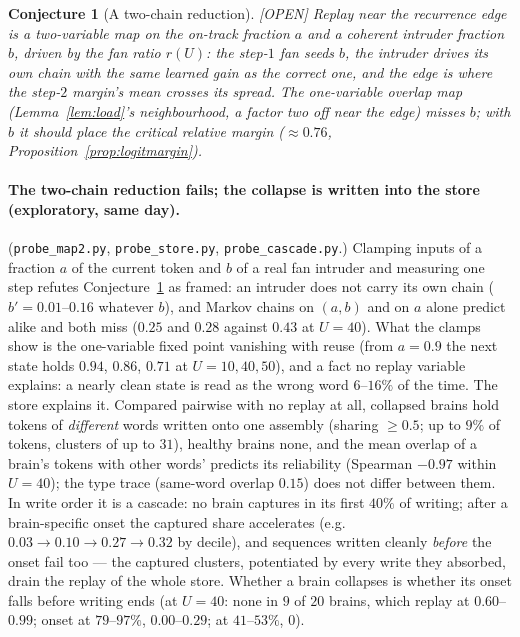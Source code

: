 \documentclass[11pt]{article}
\theoremstyle{definition}
\theoremstyle{plain}
\newtheorem{conjecture}[lemma]{Conjecture}
\newcommand{\OPEN}{\textnormal{\footnotesize\textsf{[OPEN]}}}
\begin{document}
\begin{conjecture}[A two-chain reduction]\label{conj:twochain} \OPEN
Replay near the recurrence edge is a two-variable map on the on-track fraction
$a$ and a coherent intruder fraction $b$, driven by the fan ratio $r(U)$: the
step-$1$ fan seeds $b$, the intruder drives its own chain with the same learned
gain as the correct one, and the edge is where the step-$2$ margin's mean
crosses its spread. The one-variable overlap map (Lemma~\ref{lem:load}'s
neighbourhood, a factor two off near the edge) misses $b$; with $b$ it should
place the critical relative margin ($\approx 0.76$, Proposition~\ref{prop:logitmargin}).
\end{conjecture}

\paragraph{The two-chain reduction fails; the collapse is written into the store
(exploratory, same day).} (\texttt{probe\_map2.py}, \texttt{probe\_store.py},
\texttt{probe\_cascade.py}.) Clamping inputs of a fraction $a$ of the current
token and $b$ of a real fan intruder and measuring one step refutes
Conjecture~\ref{conj:twochain} as framed: an intruder does not carry its own
chain ($b' = 0.01$--$0.16$ whatever $b$), and Markov chains on $(a,b)$ and on $a$
alone predict alike and both miss ($0.25$ and $0.28$ against $0.43$ at $U = 40$).
What the clamps show is the one-variable fixed point vanishing with reuse (from
$a = 0.9$ the next state holds $0.94$, $0.86$, $0.71$ at $U = 10, 40, 50$), and a
fact no replay variable explains: a nearly clean state is read as the wrong
word $6$--$16\%$ of the time. The store explains it. Compared pairwise with no
replay at all, collapsed brains hold tokens of \emph{different} words written
onto one assembly (sharing $\ge 0.5$; up to $9\%$ of tokens, clusters of up to
$31$), healthy brains none, and the mean overlap of a brain's tokens with other
words' predicts its reliability (Spearman $-0.97$ within $U = 40$); the type
trace (same-word overlap $0.15$) does not differ between them. In write order
it is a cascade: no brain captures in its first $40\%$ of writing; after a
brain-specific onset the captured share accelerates (e.g.\ $0.03 \to 0.10 \to
0.27 \to 0.32$ by decile), and sequences written cleanly \emph{before} the onset
fail too --- the captured clusters, potentiated by every write they absorbed,
drain the replay of the whole store. Whether a brain collapses is whether its
onset falls before writing ends (at $U = 40$: none in $9$ of $20$ brains, which
replay at $0.60$--$0.99$; onset at $79$--$97\%$, $0.00$--$0.29$; at $41$--$53\%$, $0$).
\end{document}
